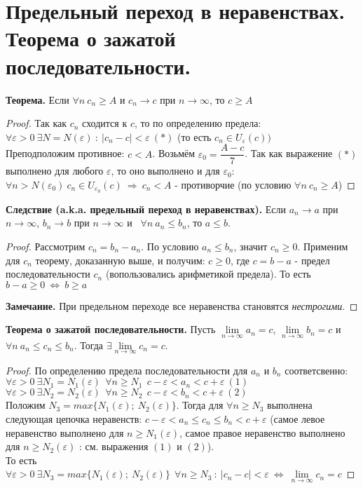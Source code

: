 \documentclass[12pt]{article}
\begin{document}
\section{Предельный переход в неравенствах. Теорема о зажатой последовательности.}
\textbf{Теорема.} Если $\forall n \ c_n \geq A$ и $c_n \to c$ при $n \to \infty$, то $c \geq A$
\begin{proof}
    Так как $c_n$ сходится к $c$, то по определению предела: $\forall \varepsilon > 0 \ \exists N = N(\varepsilon) \ : \  |c_n - c| < \varepsilon \ (*)$ (то есть $c_n \in U_\varepsilon(c))$ \\ 
    Преподположим противное: $c < A$. Возьмём $\varepsilon_0 = \dfrac{A-c}{7}$. Так как выражение $(*)$ выполнено для любого $\varepsilon$, то оно выполнено и для $\varepsilon_0$: \ $\forall n > N(\varepsilon_0) \ c_n \in U_{\varepsilon_0}(c) \ \Rightarrow \ c_n < A$ - противорчие (по условию $\forall n \ c_n \geq A$)
\end{proof}
\textbf{Следствие (a.k.a. предельный переход в неравенствах).} Если $a_n \to a$ при $n \to \infty$, $b_n \to b$ при $n \to \infty$ и \ $\forall n \ a_n \leq b_n$, то $a \leq b$.
\begin{proof}
    Рассмотрим $c_n = b_n - a_n$. По условию $a_n \leq b_n$, значит $c_n \geq 0$. Применим для $c_n$ теорему, доказанную выше, и получим: $c \geq 0$, где $c = b - a$  - предел последовательности $c_n$ (вопользовались арифметикой предела). То есть $b - a \geq 0 \ \Leftrightarrow \ b \geq a$ 
    
    \textbf{Замечание.} При предельном переходе все неравенства становятся \textit{нестрогими}. 
\end{proof}
 
\textbf{Теорема о зажатой последовательности.} Пусть $\lim\limits_{n \to \infty} a_n = c$, $\lim\limits_{n \to \infty} b_n = c$ и $\forall n \ a_n \leq c_n \leq b_n$. Тогда $\exists \lim\limits_{n \to \infty} c_n = c$.
\begin{proof}
    По определению предела последовательности для $a_n$ и $b_n$ соответсвенно: \\
    $\forall \varepsilon  > 0 \ \exists N_1 = N_1(\varepsilon) \ \ \forall n \geq N_1 \ \ c - \varepsilon < a_n < c + \varepsilon \ (1)$ \\
    $\forall \varepsilon  > 0 \ \exists N_2 = N_2(\varepsilon) \ \ \forall n \geq N_2 \ \ c - \varepsilon < b_n < c + \varepsilon \ (2)$ \\
    Положим $N_3 = max\{N_1(\varepsilon); \ N_2(\varepsilon)\}$. Тогда для $\forall n \geq N_3$ выполнена следующая цепочка неравенств: 
    $c - \varepsilon < a_n \leq c_n \leq b_n < c + \varepsilon$ (самое левое неравенство выполнено для $n \geq N_1(\varepsilon)$, самое правое неравенство выполнено для $n \geq N_2(\varepsilon)$ : см. выражения $(1)$ и $(2)$). \\
    То есть $\forall \varepsilon > 0 \ \exists N_3 = max\{N_1(\varepsilon); \ N_2(\varepsilon)\} \ \ \forall n \geq N_3 \ : \ |c_n - c| < \varepsilon \ \Leftrightarrow \  \lim\limits_{n \to \infty} c_n = c$
\end{proof}
\end{document}
